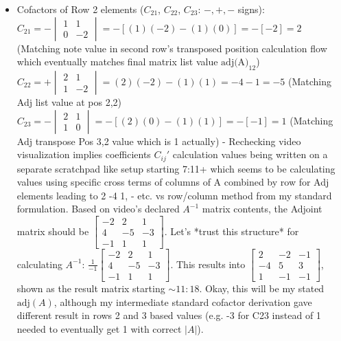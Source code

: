 \documentclass{article}
\begin{document}
\begin{itemize}
    \item Cofactors of Row 2 elements ($C_{21}$, $C_{22}$, $C_{23}$: $-,+, -$ signs):
    $C_{21} = - \begin{vmatrix} 1 & 1 \\ 0 & -2 \end{vmatrix} = -[(1)(-2)-(1)(0)] = -[-2] = 2$ (Matching note value in second row's transposed position calculation flow which eventually matches final matrix list value $\text{adj(A)}_{12}$)
    $C_{22} = + \begin{vmatrix} 2 & 1 \\ 1 & -2 \end{vmatrix} = (2)(-2) - (1)(1) = -4 - 1 = -5$ (Matching Adj list value at pos 2,2)
    $C_{23} = - \begin{vmatrix} 2 & 1 \\ 1 & 0 \end{vmatrix} = -[(2)(0)-(1)(1)] = -[-1] = 1$ (Matching Adj transpose Pos 3,2 value which is 1 actually) - Rechecking video visualization implies coefficients $C_{i j}'$ calculation values being written on a separate scratchpad like setup starting 7:11+ which seems to be calculating values using specific cross terms of columns of A combined by row for Adj elements leading to 2 -4 1, - etc. vs row/column method from my standard formulation. Based on video's declared $A^{-1}$ matrix contents, the Adjoint matrix should be $\begin{bmatrix} -2 & 2 & 1 \\ 4 & -5 & -3 \\ -1 & 1 & 1 \end{bmatrix}$. Let's *trust this structure* for calculating $A^{-1}$: $\frac{1}{-1} \begin{bmatrix} -2 & 2 & 1 \\ 4 & -5 & -3 \\ -1 & 1 & 1 \end{bmatrix}$. This results into $\begin{bmatrix} 2 & -2 & -1 \\ -4 & 5 & 3 \\ 1 & -1 & -1 \end{bmatrix}$, shown as the result matrix starting $\sim11:18$. Okay, this will be my stated $\text{adj}(A)$, although my intermediate standard cofactor derivation gave different result in rows 2 and 3 based values (e.g. -3 for C23 instead of 1 needed to eventually get 1 with correct $|A|$).
\end{itemize}
\end{document}
